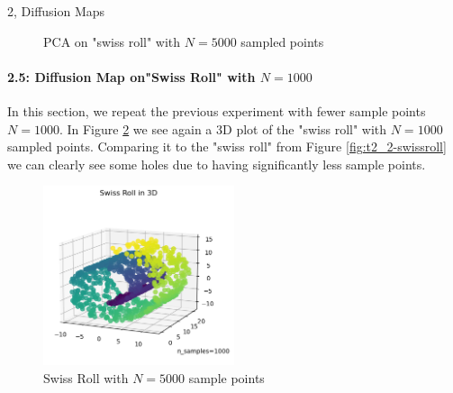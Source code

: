 \begin{task}{2, Diffusion Maps}
\begin{figure}[H]
\centering
{}
\caption{PCA on "swiss roll"  with $N=5000$ sampled points}
\label{fig:t2_2-pca5k}
\end{figure}

\paragraph{2.5: Diffusion Map on"Swiss Roll" with $N=1000$}
In this section, we repeat the previous experiment with fewer sample points $N=1000$. In Figure \ref{fig:t2_2-swissroll1k} we see again a 3D plot of the "swiss roll" with $N=1000$ sampled points. Comparing it to the "swiss roll" from Figure \ref{fig:t2_2-swissroll} we can clearly see some holes due to having significantly less sample points.
\begin{figure}[H]
\centering
\includegraphics[width=0.5\textwidth]{images_task2/t2_2-swissroll1k.png}
\caption{Swiss Roll with $N=5000$ sample points}
\label{fig:t2_2-swissroll1k}
\end{figure}


\end{task}
